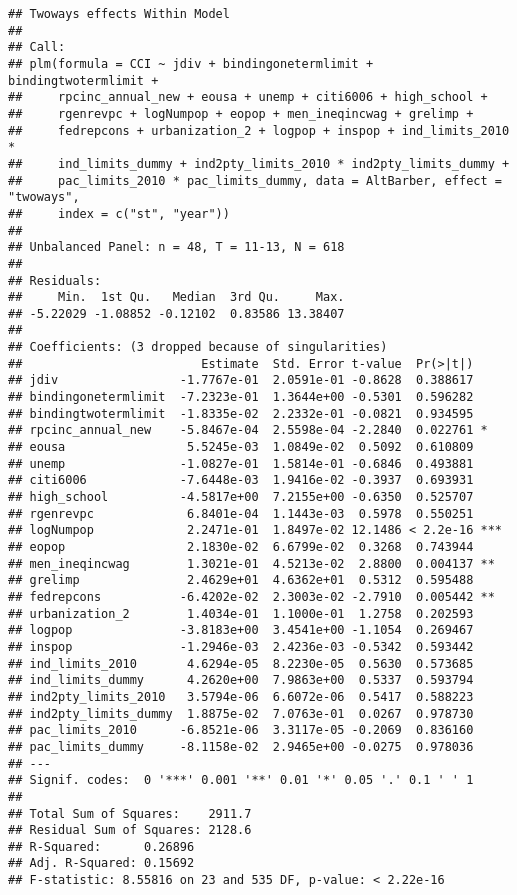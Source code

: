 \documentclass[]{article}
\begin{document}
\begin{verbatim}
## Twoways effects Within Model
## 
## Call:
## plm(formula = CCI ~ jdiv + bindingonetermlimit + bindingtwotermlimit + 
##     rpcinc_annual_new + eousa + unemp + citi6006 + high_school + 
##     rgenrevpc + logNumpop + eopop + men_ineqincwag + grelimp + 
##     fedrepcons + urbanization_2 + logpop + inspop + ind_limits_2010 * 
##     ind_limits_dummy + ind2pty_limits_2010 * ind2pty_limits_dummy + 
##     pac_limits_2010 * pac_limits_dummy, data = AltBarber, effect = "twoways", 
##     index = c("st", "year"))
## 
## Unbalanced Panel: n = 48, T = 11-13, N = 618
## 
## Residuals:
##     Min.  1st Qu.   Median  3rd Qu.     Max. 
## -5.22029 -1.08852 -0.12102  0.83586 13.38407 
## 
## Coefficients: (3 dropped because of singularities)
##                         Estimate  Std. Error t-value  Pr(>|t|)    
## jdiv                 -1.7767e-01  2.0591e-01 -0.8628  0.388617    
## bindingonetermlimit  -7.2323e-01  1.3644e+00 -0.5301  0.596282    
## bindingtwotermlimit  -1.8335e-02  2.2332e-01 -0.0821  0.934595    
## rpcinc_annual_new    -5.8467e-04  2.5598e-04 -2.2840  0.022761 *  
## eousa                 5.5245e-03  1.0849e-02  0.5092  0.610809    
## unemp                -1.0827e-01  1.5814e-01 -0.6846  0.493881    
## citi6006             -7.6448e-03  1.9416e-02 -0.3937  0.693931    
## high_school          -4.5817e+00  7.2155e+00 -0.6350  0.525707    
## rgenrevpc             6.8401e-04  1.1443e-03  0.5978  0.550251    
## logNumpop             2.2471e-01  1.8497e-02 12.1486 < 2.2e-16 ***
## eopop                 2.1830e-02  6.6799e-02  0.3268  0.743944    
## men_ineqincwag        1.3021e-01  4.5213e-02  2.8800  0.004137 ** 
## grelimp               2.4629e+01  4.6362e+01  0.5312  0.595488    
## fedrepcons           -6.4202e-02  2.3003e-02 -2.7910  0.005442 ** 
## urbanization_2        1.4034e-01  1.1000e-01  1.2758  0.202593    
## logpop               -3.8183e+00  3.4541e+00 -1.1054  0.269467    
## inspop               -1.2946e-03  2.4236e-03 -0.5342  0.593442    
## ind_limits_2010       4.6294e-05  8.2230e-05  0.5630  0.573685    
## ind_limits_dummy      4.2620e+00  7.9863e+00  0.5337  0.593794    
## ind2pty_limits_2010   3.5794e-06  6.6072e-06  0.5417  0.588223    
## ind2pty_limits_dummy  1.8875e-02  7.0763e-01  0.0267  0.978730    
## pac_limits_2010      -6.8521e-06  3.3117e-05 -0.2069  0.836160    
## pac_limits_dummy     -8.1158e-02  2.9465e+00 -0.0275  0.978036    
## ---
## Signif. codes:  0 '***' 0.001 '**' 0.01 '*' 0.05 '.' 0.1 ' ' 1
## 
## Total Sum of Squares:    2911.7
## Residual Sum of Squares: 2128.6
## R-Squared:      0.26896
## Adj. R-Squared: 0.15692
## F-statistic: 8.55816 on 23 and 535 DF, p-value: < 2.22e-16
\end{verbatim}
\end{document}

